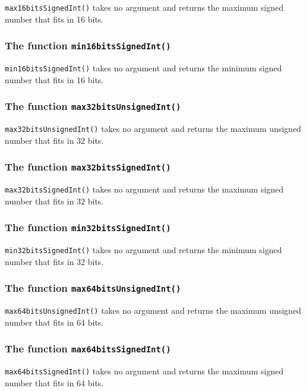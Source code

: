 \documentclass[10pt,openright,twosides,final]{memoir}
\newcommand{\gtlinline}[1]{\colorbox{light-blue}{\lstinline[language=gtl]{#1}}}
\begin{document}
\gtlinline{max16bitsSignedInt()} takes no argument and returns the maximum signed number that fits in 16 bits.

\subsubsection{The function \texttt{min16bitsSignedInt()}}

\gtlinline{min16bitsSignedInt()} takes no argument and returns the minimum signed number that fits in 16 bits.

\subsubsection{The function \texttt{max32bitsUnsignedInt()}}

\gtlinline{max32bitsUnsignedInt()} takes no argument and returns the maximum unsigned number that fits in 32 bits.

\subsubsection{The function \texttt{max32bitsSignedInt()}}

\gtlinline{max32bitsSignedInt()} takes no argument and returns the maximum signed number that fits in 32 bits.

\subsubsection{The function \texttt{min32bitsSignedInt()}}

\gtlinline{min32bitsSignedInt()} takes no argument and returns the minimum signed number that fits in 32 bits.

\subsubsection{The function \texttt{max64bitsUnsignedInt()}}

\gtlinline{max64bitsUnsignedInt()} takes no argument and returns the maximum unsigned number that fits in 64 bits.

\subsubsection{The function \texttt{max64bitsSignedInt()}}

\gtlinline{max64bitsSignedInt()} takes no argument and returns the maximum signed number that fits in 64 bits.
\end{document}

